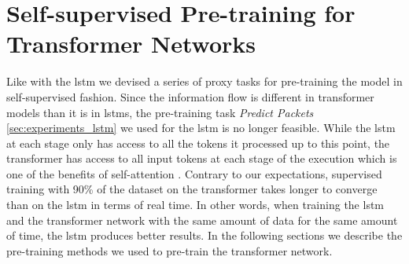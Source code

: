 \section{Self-supervised Pre-training for Transformer Networks} \label{sec:experiments:transformer}

Like with the \gls{lstm} we devised a series of proxy tasks for pre-training the model in self-supervised fashion. Since the information flow is different in transformer models than it is in \glspl{lstm}, the pre-training task \textit{Predict Packets} \ref{sec:experiments_lstm} we used for the \gls{lstm} is no longer feasible. While the \gls{lstm} at each stage only has access to all the tokens it processed up to this point, the transformer has access to all input tokens at each stage of the execution which is one of the benefits of self-attention \cite{attention}. Contrary to our expectations, supervised training with 90\% of the dataset on the transformer takes longer to converge than on the \gls{lstm} in terms of real time. In other words, when training the \gls{lstm} and the transformer network with the same amount of data for the same amount of time, the \gls{lstm} produces better results. In the following sections we describe the pre-training methods we used to pre-train the transformer network.


